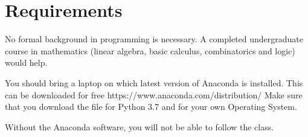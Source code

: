 \section{Requirements}
No formal background in programming is necessary. A completed undergraduate course in mathematics
(linear algebra, basic calculus, combinatorics and logic) would help.

You should bring a laptop on which latest version of Anaconda is installed.
This can be downloaded for free https://www.anaconda.com/distribution/
Make sure that you download the file for Python 3.7 and for your own Operating System.

Without the Anaconda software, you will not be able to follow the class.
